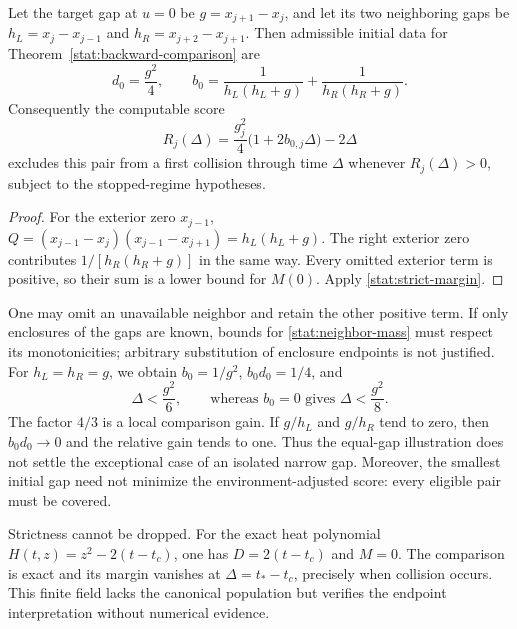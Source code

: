 \begin{corollary}
\label{stat:three-gaps}
Let the target gap at $u=0$ be $g=x_{j+1}-x_j$, and let its two neighboring
gaps be $h_L=x_j-x_{j-1}$ and $h_R=x_{j+2}-x_{j+1}$. Then admissible
initial data for Theorem~\ref{stat:backward-comparison} are
\begin{equation}
 d_0=\frac{g^2}{4},\qquad
 b_0=\frac1{h_L(h_L+g)}+\frac1{h_R(h_R+g)}.
 \label{stat:neighbor-mass}
\end{equation}
Consequently the computable score
\begin{equation}
 R_j(\Delta)=\frac{g_j^2}{4}
               \bigl(1+2b_{0,j}\Delta\bigr)-2\Delta
 \label{stat:score}
\end{equation}
excludes this pair from a first collision through time $\Delta$ whenever
$R_j(\Delta)>0$, subject to the stopped-regime hypotheses.
\end{corollary}

\begin{proof}
For the exterior zero $x_{j-1}$,
$Q=(x_{j-1}-x_j)(x_{j-1}-x_{j+1})=h_L(h_L+g)$.
The right exterior zero contributes $1/[h_R(h_R+g)]$ in the same way.
Every omitted exterior term is positive, so their sum is a lower bound
for $M(0)$. Apply \eqref{stat:strict-margin}.
\end{proof}

One may omit an unavailable neighbor and retain the other positive term.
If only enclosures of the gaps are known, bounds for
\eqref{stat:neighbor-mass} must respect its monotonicities; arbitrary
substitution of enclosure endpoints is not justified. For
$h_L=h_R=g$, we obtain $b_0=1/g^2$, $b_0d_0=1/4$, and
\begin{equation}
 \Delta<\frac{g^2}{6},
 \qquad\text{whereas }b_0=0\text{ gives }\Delta<\frac{g^2}{8}.
 \label{stat:equal-gaps}
\end{equation}
The factor $4/3$ is a local comparison gain. If $g/h_L$ and $g/h_R$
tend to zero, then $b_0d_0\to0$ and the relative gain tends to one.
Thus the equal-gap illustration does not settle the exceptional case of
an isolated narrow gap. Moreover, the smallest initial gap need not
minimize the environment-adjusted score: every eligible pair must be
covered.

Strictness cannot be dropped. For the exact heat polynomial
$H(t,z)=z^2-2(t-t_c)$, one has $D=2(t-t_c)$ and $M=0$.
The comparison is exact and its margin vanishes at
$\Delta=t_*-t_c$, precisely when collision occurs. This finite field
lacks the canonical population but verifies the endpoint interpretation
without numerical evidence.

